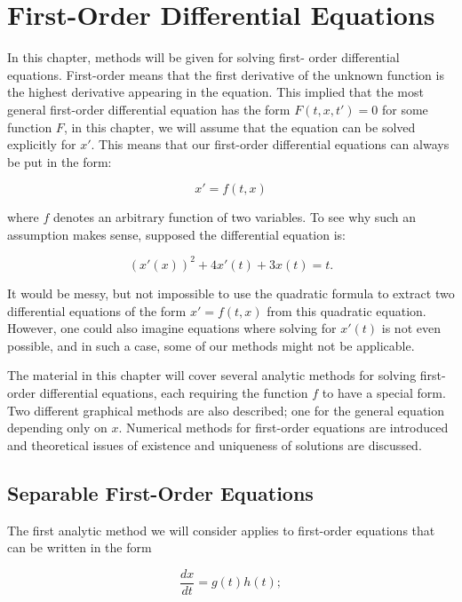 \chapter{First-Order Differential Equations}

In this chapter, methods will be given for solving first- order differential equations. First-order means that the first derivative of the unknown function is the highest derivative appearing in the equation. This implied that the most general first-order differential equation has the form $F(t,x,t')=0$ for some function $F$, in this chapter, we will assume that the equation can be solved explicitly for $x'$. This means that our first-order differential equations can always be put in the form:

\begin{equation}
  x'=f(t,x)
\end{equation}

where $f$ denotes an arbitrary function of two variables. To see why such an assumption makes sense, supposed the differential equation is:

\begin{equation}
  (x'(x))^2+4x'(t)+3x(t)=t.
\end{equation}

It would be messy, but not impossible to use the quadratic formula to extract two differential equations of the form $x'=f(t,x)$ from this quadratic equation. However, one could also imagine equations where solving for $x'(t)$ is not even possible, and in such a case, some of our methods might not be applicable.

The material in this chapter will cover several analytic methods for solving first-order differential equations, each requiring the function $f$ to have a special form. Two different graphical methods are also described; one for the general equation depending only on $x$. Numerical methods for first-order equations are introduced and theoretical issues of existence and uniqueness of solutions are discussed.

\section{Separable First-Order Equations}

  The first analytic method we will consider applies to first-order equations that can be written in the form

  \begin{equation}
    \frac{dx}{dt} = g(t)h(t);
  \end{equation}

